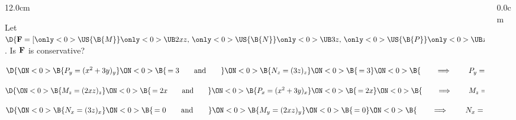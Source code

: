 \begin{frame}
\begin{columns}\begin{column}{12.0cm}

\vspace{0.1cm}

\scriptsize

\EX Let $\D{{\bf F} = [
\only<0>{\US{\B{ M }}}{\only<0>{\UB}{ 2xz }},\,
\only<0>{\US{\B{ N }}}{\only<0>{\UB}{ 3z }},\,
\only<0>{\US{\B{ P }}}{\only<0>{\UB}{ x^2+3y }}]}$. \quad Is ${\bf F}$ is conservative?

\vspace{0.2cm}


\vspace{0.5cm}

$\D{
\ON<0>{\B{P_y = (x^2+3y)_y }}
\ON<0>{\B{\,= 3
\qquad \text{and} \qquad }}
\ON<0>{\B{N_z = (3z)_z}}
\ON<0>{\B{\, = 3}}
\ON<0>{\B{\qquad \implies \qquad P_y=N_z \,\, \checkmark}}
}$

\vspace{0.5cm}

$\D{
\ON<0>{\B{M_z = (2xz)_z }}
\ON<0>{\B{\,= 2x
\qquad \text{and} \qquad }}
\ON<0>{\B{P_x = (x^2+3y)_x }}
\ON<0>{\B{\,= 2x }}
\ON<0>{\B{\qquad \implies \qquad M_z=P_x \,\, \checkmark}}
}$

\vspace{0.5cm}

$\D{
\ON<0>{\B{N_x = (3z)_x }}
\ON<0>{\B{\,= 0
\qquad \text{and} \qquad }}
\ON<0>{\B{M_y = (2xz)_y }}
\ON<0>{\B{\,= 0 }}
\ON<0>{\B{\qquad \implies \qquad N_x=M_y \,\, \checkmark}}
}$

\vspace{0.5cm}


\vspace{4.6cm}

\end{column}\begin{column}{0.0cm}\end{column}\end{columns}
\end{frame}

